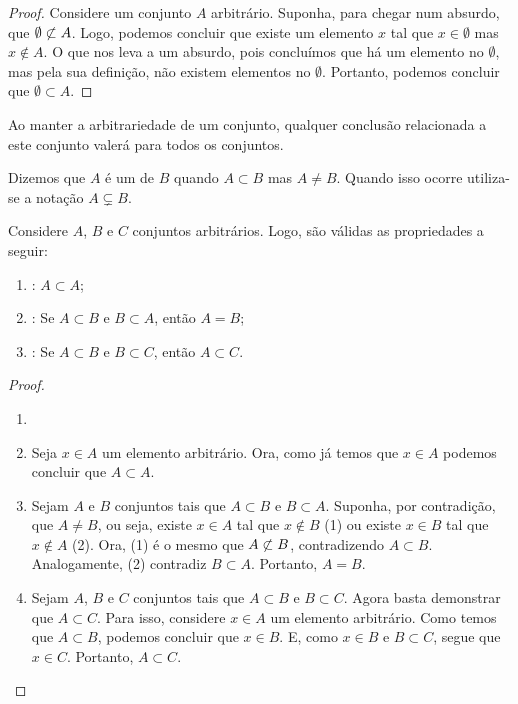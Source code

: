 \begin{proof}
Considere um conjunto $A$ arbitrário.
Suponha, para chegar num absurdo, que $\emptyset \not\subset A$.
Logo, podemos concluir que existe um elemento $x$ tal que $x \in \emptyset$ mas $x \notin A$.
O que nos leva a um absurdo, pois concluímos que há um elemento no $\emptyset$, mas pela sua definição, não existem elementos no $\emptyset$.
Portanto, podemos concluir que $\emptyset \subset A$.
\end{proof}

\begin{remark}
Ao manter a arbitrariedade de um conjunto, qualquer conclusão relacionada a este conjunto valerá para todos os conjuntos.
\end{remark}

\begin{definition}
Dizemos que $A$ é um  de $B$ quando $A \subset B$ mas $A \neq B$. Quando isso ocorre utiliza-se a notação $A \subsetneq B$.
\end{definition}

\begin{proposition}
Considere $A$, $B$ e $C$ conjuntos arbitrários. Logo, são válidas as propriedades a seguir:
%
\begin{enumerate}
\item {}: $A \subset A$;
\item {}: Se $A \subset B$ e $B \subset A$, então $A = B$;
\item {}: Se $A \subset B$ e $B \subset C$, então $A \subset C$.
\end{enumerate}
\end{proposition}

\begin{proof}
\begin{enumerate}

\item[] %

\item
	Seja $x \in A$ um elemento arbitrário.
	Ora, como já temos que $x \in A$ podemos concluir que $A \subset A$.

\item
	Sejam $A$ e $B$ conjuntos tais que $A \subset B$ e $B \subset A$.
	Suponha, por contradição, que $A \ne B$, ou seja, existe $x \in A$ tal que $x \notin B$ (1) ou existe $x \in B$ tal que $x \notin A$ (2).
	Ora, (1) é o mesmo que $A \not\subset B$, contradizendo $A \subset B$.
	Analogamente, (2) contradiz $B \subset A$.
	Portanto, $A = B$.

\item
	Sejam $A$, $B$ e $C$ conjuntos tais que $A \subset B$ e $B \subset C$.
	Agora basta demonstrar que $A \subset C$.
	Para isso, considere $x \in A$ um elemento arbitrário.
	Como temos que $A \subset B$, podemos concluir que $x \in B$.
	E, como $x \in B$ e $B \subset C$, segue que $x \in C$.
	Portanto, $A \subset C$.

\end{enumerate}
\end{proof}

